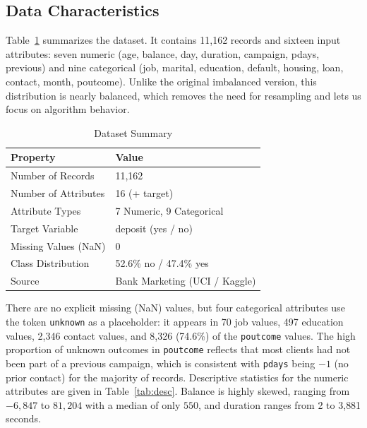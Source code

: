 \documentclass[conference]{IEEEtran}
\begin{document}
	\subsection{Data Characteristics}
	Table~\ref{tab:dataset} summarizes the dataset. It contains 11,162 records and
	sixteen input attributes: seven numeric (age, balance, day, duration,
	campaign, pdays, previous) and nine categorical (job, marital, education,
	default, housing, loan, contact, month, poutcome). Unlike the original
	imbalanced version, this distribution is nearly balanced, which removes the
	need for resampling and lets us focus on algorithm behavior.

	\begin{table}[htbp]
		\caption{Dataset Summary}
		\begin{center}
			\begin{tabular}{|l|l|}
				\hline
				\textbf{Property} & \textbf{Value} \\
				\hline
				Number of Records & 11,162 \\
				\hline
				Number of Attributes & 16 (+ target) \\
				\hline
				Attribute Types & 7 Numeric, 9 Categorical \\
				\hline
				Target Variable & deposit (yes / no) \\
				\hline
				Missing Values (NaN) & 0 \\
				\hline
				Class Distribution & 52.6\% no / 47.4\% yes \\
				\hline
				Source & Bank Marketing (UCI / Kaggle) \\
				\hline
			\end{tabular}
			\label{tab:dataset}
		\end{center}
	\end{table}

	There are no explicit missing (NaN) values, but four categorical attributes
	use the token \texttt{unknown} as a placeholder: it appears in 70 job values,
	497 education values, 2{,}346 contact values, and 8{,}326 (74.6\%) of the
	\texttt{poutcome} values. The high proportion of unknown outcomes in
	\texttt{poutcome} reflects that most clients had not been part of a previous
	campaign, which is consistent with \texttt{pdays} being $-1$ (no prior contact)
	for the majority of records. Descriptive statistics for the numeric attributes
	are given in Table~\ref{tab:desc}. Balance is highly skewed, ranging from
	$-6{,}847$ to $81{,}204$ with a median of only $550$, and duration ranges from
	2 to 3{,}881 seconds.
\end{document}

